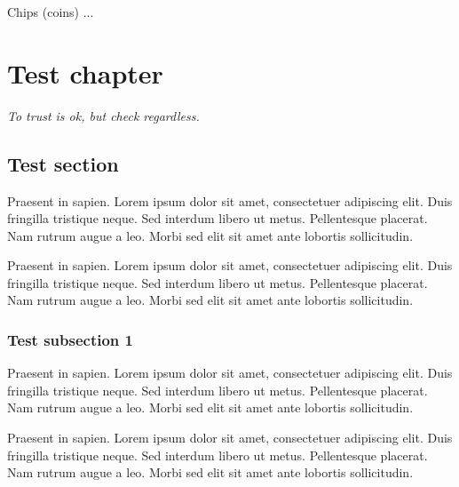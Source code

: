 \documentclass[a5paper,12pt,draft]{book} %
\begin{document}
Chips (coins) ...

\clearpage

\chapter*{Test chapter}

\begin{flushright}
\parbox{0.6\textwidth}{
\emph{To trust is ok, but check regardless. \\
 } }
\end{flushright}

\section*{Test section}

Praesent in sapien. Lorem ipsum dolor sit amet, consectetuer adipiscing elit.
Duis fringilla tristique neque. Sed interdum libero ut metus. Pellentesque placerat.
Nam rutrum augue a leo. Morbi sed elit sit amet ante lobortis sollicitudin.

Praesent in sapien. Lorem ipsum dolor sit amet, consectetuer adipiscing elit.
Duis fringilla tristique neque. Sed interdum libero ut metus. Pellentesque placerat.
Nam rutrum augue a leo. Morbi sed elit sit amet ante lobortis sollicitudin.

\subsection*{Test subsection 1}
Praesent in sapien. Lorem ipsum dolor sit amet, consectetuer adipiscing elit.
Duis fringilla tristique neque. Sed interdum libero ut metus. Pellentesque placerat.
Nam rutrum augue a leo. Morbi sed elit sit amet ante lobortis sollicitudin.

Praesent in sapien. Lorem ipsum dolor sit amet, consectetuer adipiscing elit.
Duis fringilla tristique neque. Sed interdum libero ut metus. Pellentesque placerat.
Nam rutrum augue a leo. Morbi sed elit sit amet ante lobortis sollicitudin.
\end{document}
